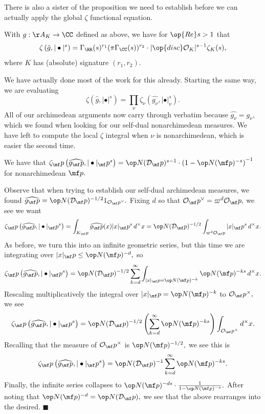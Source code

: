 There is also a sister of the proposition we need to establish before we can actually apply the global $\zeta$ functional equation.
\begin{proposition}
    With $g:\AA_K\to\CC$ defined as above, we have for $\op{Re}s>1$ that
    \[\zeta\left(\hat g,|\bullet|^s\right)=\Gamma_\RR(s)^{r_1}(\pi\Gamma_\CC(s))^{r_2}\cdot|\op{disc}\mathcal O_K|^{s-1}\zeta_K(s),\]
    where $K$ has (absolute) signature $(r_1,r_2).$
\end{proposition}
We have actually done most of the work for this already. Starting the same way, we are evaluating
\[\zeta\left(\hat g,|\bullet|^s\right)=\prod_\nu\zeta_\nu\left(\widehat{g_\nu},|\bullet|_\nu^s\right).\]
All of our archimedean arguments now carry through verbatim because $\widehat{g_\nu}=g_\nu,$ which we found when looking for our self-dual nonarchimedean measures. We have left to compute the local $\zeta$ integral when $\nu$ is nonarchimedean, which is easier the second time.
\begin{lemma}
    We have that $\zeta_\mf p\left(\widehat{g_\mf p},|\bullet|_\mf p^s\right)=\op N(\mathcal D_\mf p)^{s-1}\cdot\left(1-\op N(\mf p)^{-s}\right)^{-1}$ for nonarchimedean $\mf p.$
\end{lemma}
Observe that when trying to establish our self-dual archimedean measures, we found $\widehat{g_\mf p}=\op N(\mathcal D_\mf p)^{-1/2}1_{\mathcal O_\mf p^\vee}.$ Fixing $d$ so that $\mathcal O_\mf p^\vee=\varpi^d\mathcal O_\mf p,$ we see we want
\[\zeta_\mf p\left(\widehat{g_\mf p},|\bullet|_\mf p^s\right)=\int_{K_\mf p}\widehat{g_\mf p}(x)|x|_\mf p^s\,d^\times x=\op N(\mathcal D_\mf p)^{-1/2}\int_{\varpi^d\mathcal O_\mf p}|x|_\mf p^s\,d^\times x.\]
As before, we turn this into an infinite geometric series, but this time we are integrating over $|x|_\mf p\le\op N(\mf p)^{-d},$ so
\[\zeta_\mf p\left(\widehat{g_\mf p},|\bullet|_\mf p^s\right)=\op N(\mathcal D_\mf p)^{-1/2}\sum_{k=d}^\infty\int_{|x|_\mf p=\op N(\mf p)^{-k}}\op N(\mf p)^{-ks}\,d^\times x.\]
Rescaling multiplicatively the integral over $|x|_\mf p=\op N(\mf p)^{-k}$ to $\mathcal O_\mf p^\times,$ we see
\[\zeta_\mf p\left(\widehat{g_\mf p},|\bullet|_\mf p^s\right)=\op N(\mathcal D_\mf p)^{-1/2}\left(\sum_{k=d}^\infty\op N(\mf p)^{-ks}\right)\int_{\mathcal O_\mf p^\times}d^\times x.\]
Recalling that the measure of $\mathcal O_\mf p^\times$ is $\op N(\mf p)^{-1/2},$ we see this is
\[\zeta_\mf p\left(\widehat{g_\mf p},|\bullet|_\mf p^s\right)=\op N(\mathcal D_\mf p)^{-1}\sum_{k=d}^\infty\op N(\mf p)^{-ks}.\]
Finally, the infinite series collapses to $\op N(\mf p)^{-ds}\cdot\frac1{1-\op N(\mf p)^{-s}}.$ After noting that $\op N(\mf p)^{-d}=\op N(\mathcal D_\mf p),$ we see that the above rearranges into the desired. $\blacksquare$

